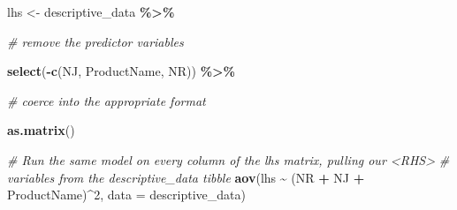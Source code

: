 \documentclass[
]{book}
\newenvironment{Shaded}{\begin{snugshade}}{\end{snugshade}}
\newcommand{\AttributeTok}[1]{\textcolor[rgb]{0.13,0.29,0.53}{#1}}
\newcommand{\CommentTok}[1]{\textcolor[rgb]{0.56,0.35,0.01}{\textit{#1}}}
\newcommand{\DecValTok}[1]{\textcolor[rgb]{0.00,0.00,0.81}{#1}}
\newcommand{\FunctionTok}[1]{\textcolor[rgb]{0.13,0.29,0.53}{\textbf{#1}}}
\newcommand{\NormalTok}[1]{#1}
\newcommand{\OtherTok}[1]{\textcolor[rgb]{0.56,0.35,0.01}{#1}}
\newcommand{\SpecialCharTok}[1]{\textcolor[rgb]{0.81,0.36,0.00}{\textbf{#1}}}
\begin{document}
\begin{Shaded}
\begin{Highlighting}[]
\NormalTok{lhs }\OtherTok{\textless{}{-}} 
\NormalTok{  descriptive\_data }\SpecialCharTok{\%\textgreater{}\%}
  
  \CommentTok{\# remove the predictor variables}
  
  \FunctionTok{select}\NormalTok{(}\SpecialCharTok{{-}}\FunctionTok{c}\NormalTok{(NJ, ProductName, NR)) }\SpecialCharTok{\%\textgreater{}\%}

  \CommentTok{\# coerce into the appropriate format}
  
  \FunctionTok{as.matrix}\NormalTok{()}

\CommentTok{\# Run the same model on every column of the lhs matrix, pulling our \textless{}RHS\textgreater{}}
\CommentTok{\# variables from the descriptive\_data tibble}
\FunctionTok{aov}\NormalTok{(lhs }\SpecialCharTok{\textasciitilde{}}\NormalTok{ (NR }\SpecialCharTok{+}\NormalTok{ NJ }\SpecialCharTok{+}\NormalTok{ ProductName)}\SpecialCharTok{\^{}}\DecValTok{2}\NormalTok{, }\AttributeTok{data =}\NormalTok{ descriptive\_data)}
\end{Highlighting}
\end{Shaded}
\end{document}
